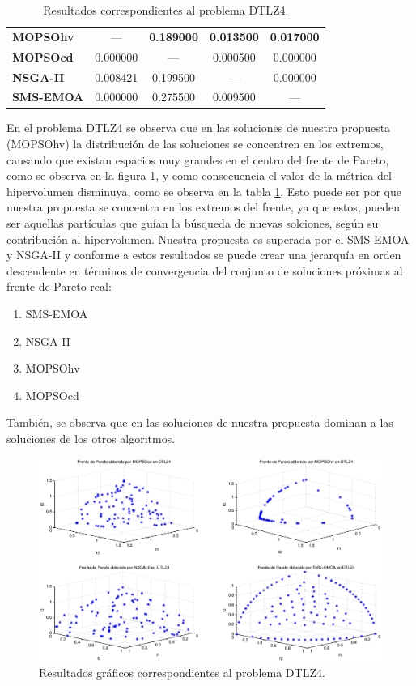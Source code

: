 \begin{table}
\begin{center}
\begin{tabular}{|l|cc|cc|}
	\textbf{MOPSOhv} &---       & \textbf{0.189000}   & \textbf{0.013500}   &  \textbf{0.017000} \\ 
	\textbf{MOPSOcd} & 0.000000  & ---       & 0.000500   &  0.000000   \\ 
	\textbf{NSGA-II} & 0.008421  & 0.199500  & ---       &  0.000000  \\  
	\textbf{SMS-EMOA}&  0.000000 & 0.275500  & 0.009500 & --- \\  
	\hline
	\end{tabular}
\caption{Resultados correspondientes al problema DTLZ4.}
  \label{tab:dtlz4}
\end{center}
\end{table}
En el problema DTLZ4 se observa que en las soluciones de nuestra propuesta (MOPSOhv) la distribuci\'on de las soluciones se concentren
en los extremos, causando que existan espacios muy grandes en el centro del frente de Pareto, como se observa en la 
figura \ref{fig:rDTLZ4}, y como consecuencia  el valor de la m\'etrica del hipervolumen disminuya, como se observa en la tabla \ref{tab:dtlz4}. 
Esto puede ser por que nuestra propuesta se concentra en los extremos del frente, ya que estos, pueden
ser aquellas part\'iculas que gu\'ian la b\'usqueda de nuevas solciones, seg\'un su contribuci\'on al hipervolumen. Nuestra propuesta es superada 
por el SMS-EMOA y NSGA-II y conforme a estos resultados se puede crear una jerarqu\'ia en orden descendente en t\'erminos de convergencia del conjunto de 
soluciones pr\'oximas al frente de Pareto real:


\begin{enumerate}
  \item SMS-EMOA
  \item NSGA-II
  \item MOPSOhv
  \item MOPSOcd
\end{enumerate}

Tambi\'en, se observa que en las soluciones de nuestra propuesta dominan a las soluciones de los otros algoritmos.
\clearpage
\newpage

\begin{figure}
      \begin{center}
	  \includegraphics[scale=0.45]{Cap4/rdtlz4r.eps}
      \end{center}
	\caption{Resultados gr\'aficos correspondientes al problema DTLZ4.}
      \label{fig:rDTLZ4}
   \end{figure}

